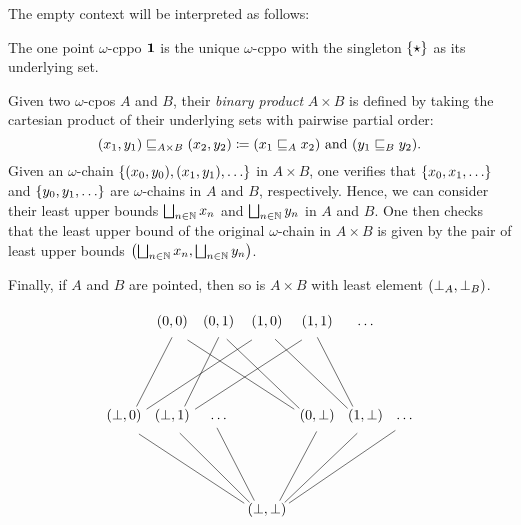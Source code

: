 The empty context will be interpreted as follows:

\begin{example}
  The one point \(\omega\)-cppo \(\One\) is the unique \(\omega\)-cppo with the
  singleton \(\set{\star}\) as its underlying set.
\end{example}

\begin{definition}
  Given two \(\omega\)-cpos \(A\) and \(B\), their \emph{binary product}
  \(A \times B\) is defined by taking the cartesian product of their underlying
  sets with pairwise partial order:
  \[
    (x_1 , y_1) \below_{A \times B} (x_2 , y_2) %
    \coloneqq (x_1 \below_A x_2) \text{ and } (y_1 \below_B y_2).
  \]
  Given an \(\omega\)-chain \(\set{(x_0,y_0),(x_1,y_1),\dots}\) in
  \(A \times B\), one verifies that \(\set{x_0,x_1,\dots}\) and
  \(\set{y_0,y_1,\dots}\) are \(\omega\)-chains in \(A\) and \(B\),
  respectively.
  Hence, we can consider their least upper bounds \(\bigsqcup_{n \in \Nat}x_n\)
  and \(\bigsqcup_{n \in \Nat}y_n\) in \(A\) and \(B\).
  One then checks that the least upper bound of the original \(\omega\)-chain in
  \(A \times B\) is given by the pair of least upper bounds
  \(\pa*{\bigsqcup_{n \in \Nat}x_n , \bigsqcup_{n \in \Nat}y_n}\).

  Finally, if \(A\) and \(B\) are pointed, then so is \(A \times B\) with least
  element \(\pa*{\bot_A , \bot_B}\).
\end{definition}

\begin{example}
  \[
    \begin{tikzcd}[column sep=1pt, row sep=50pt]
      & (0,0) & (0,1) & (1,0) & (1,1) & \dots \\
      (\bot,0) \ar[ur, no head, shift right=5pt]
      \ar[urrr, no head, shift right=5pt]
      & (\bot,1)
      \ar[ur, no head, shift right=5pt]
      \ar[urrr, no head, shift right=5pt]
      & \dots
      &
      & (0,\bot)
      \ar[ulll, no head, shift left=5pt]
      \ar[ull, no head, shift left=5pt]
      & (1,\bot)
      \ar[ull, no head, shift left=5pt]
      \ar[ul, no head, shift left=5pt]
      & \dots \\
      & & & (\bot,\bot)
      \ar[ulll,no head, shift left=5pt] \ar[ull, no head, shift left=5pt]
      \ar[ul, no head, shift left=5pt] \ar[ur, no head, shift right=5pt]
      \ar[urr, no head, shift right=5pt] \ar[urrr, no head, shift right=5pt]
    \end{tikzcd}
  \]
\end{example}


